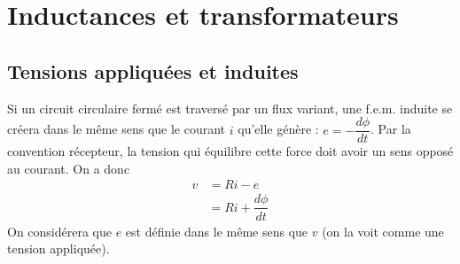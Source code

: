 \chapter{Inductances et transformateurs}
\section{Tensions appliquées et induites}
Si un circuit circulaire fermé est traversé par un flux variant, 
une f.e.m. induite se créera dans le même sens que le courant $i$ 
qu'elle génère : $e = -\dfrac{d\phi}{dt}$. Par la convention 
récepteur, la tension qui équilibre cette force doit avoir un 
sens opposé au courant. On a donc
\begin{equation}
\begin{array}{ll}
v &= Ri - e\\
 &= Ri + \dfrac{d\phi}{dt}
\end{array}
\label{eq:Maxou}
\end{equation}
On considérera que $e$ est définie dans le même sens que $v$ (on 
la voit comme une tension appliquée).

